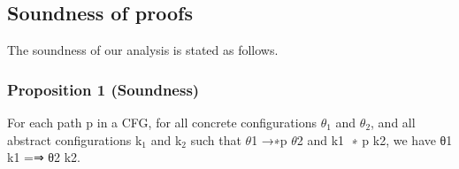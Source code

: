 \subsection{Soundness of proofs}
The soundness of our analysis is stated as follows.
\vskip 0.1in
\subsubsection{Proposition 1 (Soundness)}
For each path p in a CFG, for all concrete configurations $\theta_1$
and $\theta_2$, and all abstract configurations k$_1$ and k$_2$ such that
$\theta$1 →∗p
$\theta$2 and k1 ∗
p k2, we have θ1  k1 =⇒ θ2  k2.
